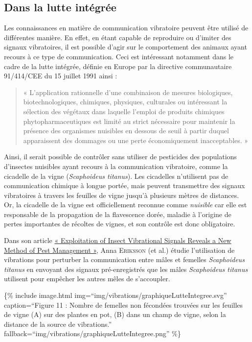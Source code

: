 \subsection{Dans la lutte intégrée}\label{dans-la-lutte-intuxe9gruxe9e}

Les connaissances en matière de communication vibratoire peuvent être
utilisé de différentes manière. En effet, en étant capable de reproduire
ou d'imiter des signaux vibratoires, il est possible d'agir sur le
comportement des animaux ayant recours à ce type de communication. Ceci
est intéressant notamment dans le cadre de la lutte intégrée, définie en
Europe par la directive communautaire 91/414/CEE du 15 juillet 1991
ainsi :

\begin{quote}
« L'application rationnelle d'une combinaison de mesures biologiques,
biotechnologiques, chimiques, physiques, culturales ou intéressant la
sélection des végétaux dans laquelle l'emploi de produits chimiques
phytopharmaceutiques est limité au strict nécessaire pour maintenir la
présence des organismes nuisibles en dessous de seuil à partir duquel
apparaissent des dommages ou une perte économiquement inacceptables. »
\end{quote}

Ainsi, il serait possible de contrôler sans utiliser de pesticides des
populations d'insectes nuisibles ayant recours à la communication
vibratoire, comme la cicadelle de la vigne (\emph{Scaphoideus titanus}).
Les cicadelles n'utilisent pas de communication chimique à longue
portée, mais peuvent transmettre des signaux vibratoires à travers les
feuilles de vigne jusqu'à plusieurs mètres de distances. Or, la
cicadelle de la vigne est officiellement reconnue comme \emph{nuisible}
car elle est responsable de la propagation de la flavescence dorée,
maladie à l'origine de pertes importantes de récoltes de vignes, et son
contrôle est donc obligatoire.

Dans son article
\href{http://journals.plos.org/plosone/article?id=10.1371/journal.pone.0032954}{«
Exploitation of Insect Vibrational Signals Reveals a New Method of Pest
Management »}, Anna \textsc{Eriksson} (et al.) étudie l'utilisation de
vibrations pour perturber la communication entre mâles et femelles
\emph{Scaphoideus titanus} en envoyant des signaux pré-enregistrés que
les mâles \emph{Scaphoideus titanus} utilisent pour empêcher les autres
mêles de s'accoupler.

\{\% include image.html
img=``img/vibrations/graphiqueLutteIntegree.svg'' caption=``Figure 11 :
Nombre de femelles non fécondées trouvées sur les feuilles de vigne (A)
sur des plantes en pot, (B) dans un champ de vigne, selon la distance de
la source de vibrations.''
fallback=``img/vibrations/graphiqueLutteIntegree.png'' \%\}

